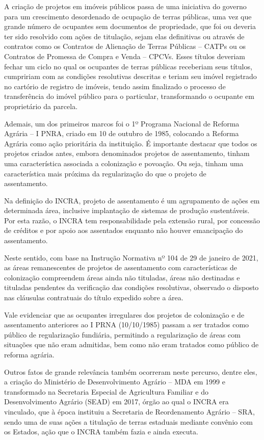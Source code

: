 \documentclass[
  letterpaper,
]{report}
\begin{document}
A criação de projetos em imóveis públicos passa de uma iniciativa do
governo para um crescimento desordenado de ocupação de terras públicas,
uma vez que grande número de ocupantes sem documentos de propriedade,
que foi ou deveria ter sido resolvido com ações de titulação, sejam elas
definitivas ou através de contratos como os Contratos de Alienação de
Terras Públicas -- CATPs ou os Contratos de Promessa de Compra e Venda
-- CPCVs. Esses títulos deveriam fechar um ciclo no qual os ocupantes de
terras públicas receberiam seus títulos, cumpririam com as condições
resolutivas descritas e teriam seu imóvel registrado no cartório de
registro de imóveis, tendo assim finalizado o processo de transferência
do imóvel público para o particular, transformando o ocupante em
proprietário da parcela.~~

Ademais, um dos primeiros marcos foi o 1º Programa Nacional de Reforma
Agrária -- I PNRA, criado em 10 de outubro de 1985, colocando a Reforma
Agrária como ação prioritária da instituição. É importante destacar que
todos os projetos criados antes, embora denominados projetos de
assentamento, tinham uma característica associada a colonização e
povoação. Ou seja, tinham uma característica mais próxima da
regularização do que o projeto de assentamento.~~~~

Na definição do INCRA, projeto de assentamento é um agrupamento de ações
em determinada área, inclusive implantação de sistemas de produção
sustentáveis. Por esta razão, o INCRA tem responsabilidade pela extensão
rural, por concessão de créditos e por apoio aos assentados enquanto não
houver emancipação do assentamento.~~~

Neste sentido, com base na Instrução Normativa nº 104 de 29 de janeiro
de 2021, as áreas remanescentes de projetos de assentamento com
características de colonização compreendem áreas ainda não tituladas,
áreas não destinadas e tituladas pendentes da verificação das condições
resolutivas, observado o disposto nas cláusulas contratuais do título
expedido sobre a área.~

Vale evidenciar que as ocupantes irregulares dos projetos de colonização
e de assentamento anteriores ao I PRNA (10/10/1985) passam a ser
tratados como público de regularização fundiária, permitindo a
regularização de áreas com situações que não eram admitidas, bem como
não eram tratados como público de reforma agrária.~

Outros fatos de grande relevância também ocorreram neste percurso,
dentre eles, a criação do Ministério de Desenvolvimento Agrário -- MDA
em 1999 e transformado na Secretaria Especial de Agricultura Familiar e
do Desenvolvimento Agrário (SEAD) em 2017, órgão ao qual o INCRA era
vinculado, que à época instituiu a Secretaria de Reordenamento Agrário
-- SRA, sendo uma de suas ações a titulação de terras estaduais mediante
convênio com os Estados, ação que o INCRA também fazia e ainda
executa.~~~
\end{document}
